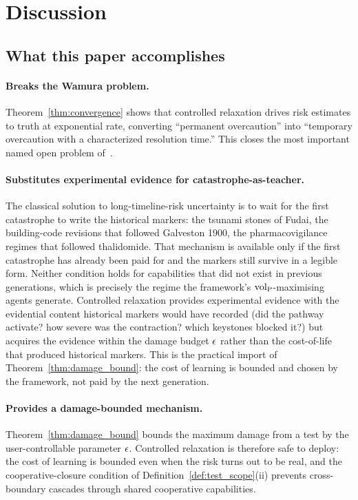 \section{Discussion}
\label{sec:discussion}

\subsection{What this paper accomplishes}

\paragraph{Breaks the Wamura problem.}
Theorem~\ref{thm:convergence} shows that controlled relaxation
drives risk estimates to truth at exponential rate, converting
``permanent overcaution'' into ``temporary overcaution with a
characterized resolution time.''  This closes the most important
named open problem of~\citep{lasser2026horizon}.

\paragraph{Substitutes experimental evidence for catastrophe-as-teacher.}
The classical solution to long-timeline-risk uncertainty is to
wait for the first catastrophe to write the historical markers:
the tsunami stones of Fudai, the building-code revisions that
followed Galveston 1900, the pharmacovigilance regimes that
followed thalidomide.  That mechanism is available only if the
first catastrophe has already been paid for and the markers still
survive in a legible form.  Neither condition holds for
capabilities that did not exist in previous generations, which
is precisely the regime the framework's ${\operatorname{vol}_{\mathrm{P}}}$-maximising agents
generate.  Controlled relaxation provides experimental evidence
with the evidential content historical markers would have
recorded (did the pathway activate?  how severe was the
contraction?  which keystones blocked it?) but acquires the
evidence within the damage budget $\epsilon$ rather than the
cost-of-life that produced historical markers.  This is the
practical import of Theorem~\ref{thm:damage_bound}: the cost of
learning is bounded and chosen by the framework, not paid by the
next generation.

\paragraph{Provides a damage-bounded mechanism.}
Theorem~\ref{thm:damage_bound} bounds the maximum damage from a
test by the user-controllable parameter $\epsilon$.
Controlled relaxation is therefore safe to deploy: the cost of
learning is bounded even when the risk turns out to be real, and
the cooperative-closure condition of
Definition~\ref{def:test_scope}(ii) prevents cross-boundary
cascades through shared cooperative capabilities.


